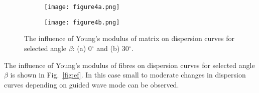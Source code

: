 \documentclass[preprint,12pt]{elsarticle}
\begin{document}
\begin{figure} [h!]
	\centering
	\begin{subfigure}[b]{0.49\textwidth}
		\centering
		\texttt{[image: figure4a.png]}
		\caption{}
		\label{fig:em0}
	\end{subfigure}
	\hfill
	\begin{subfigure}[b]{0.49\textwidth}
		\centering
		\texttt{[image: figure4b.png]}
		\caption{}
		\label{fig:em30}
	\end{subfigure}
	\caption{The influence of Young's modulus of matrix  on dispersion curves for 
	selected angle \(\beta\): (a) 0\(^{\circ}\) and (b) 30\(^{\circ}\).} 
	\label{fig:em}
\end{figure}

The influence of Young's modulus of fibres on dispersion curves for selected angle 
\(\beta\) is shown in Fig.~\ref{fig:ef}. In this case small to moderate changes in 
dispersion curves depending on guided wave mode can be observed. 
\end{document}
